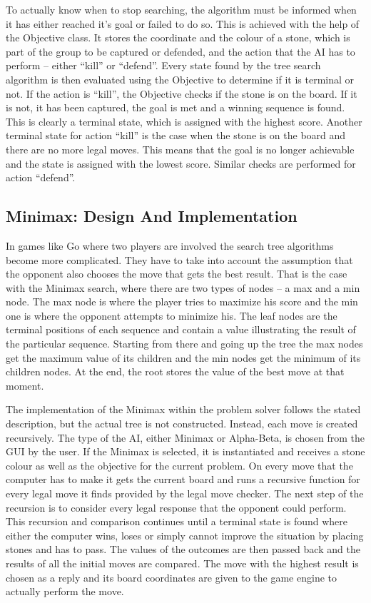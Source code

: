 \documentclass{l3proj}
\begin{document}
To actually know when to stop searching, the algorithm must be informed when it has either reached it's goal or failed to do so. This is achieved with the help of the Objective class. It stores the coordinate and the colour of a stone, which is part of the group to be captured or defended, and the action that the AI has to perform – either “kill” or “defend”. Every state found by the tree search algorithm is then evaluated using the Objective to determine if it is terminal or not. If the action is “kill”, the Objective checks if the stone is on the board. If it is not, it has been captured, the goal is met and a winning sequence is found. This is clearly a terminal state, which is assigned with the highest score. Another terminal state for action “kill” is the case when the stone is on the board and there are no more legal moves. This means that the goal is no longer achievable and the state is assigned with the lowest score. Similar checks are performed for action “defend”.

\subsection{Minimax: Design And Implementation}

In games like Go where two players are involved the search tree algorithms become more complicated. They have to take into account the assumption that the opponent also chooses the move that gets the best result. That is the case with the Minimax search, where there are two types of nodes – a max and a min node. The max node is where the player tries to maximize his score and the min one is where the opponent attempts to minimize his. The leaf nodes are the terminal positions of each sequence and contain a value illustrating the result of the particular sequence. Starting from there and going up the tree the max nodes get the maximum value of its children and the min nodes get the minimum of its children nodes. At the end, the root stores the value of the best move at that moment.  

The implementation of the Minimax within the problem solver follows the stated description, but the actual tree is not constructed. Instead, each move is created recursively. The type of the AI, either Minimax or Alpha-Beta, is chosen from the GUI by the user. If the Minimax is selected, it is instantiated and receives a stone colour as well as the objective for the current problem. On every move that the computer has to make it gets the current board and runs a recursive function for every legal move it finds provided by the legal move checker. The next step of the recursion is to consider every legal response that the opponent could perform. This recursion and comparison continues until a terminal state is found where either the computer wins, loses or simply cannot improve the situation by placing stones and has to pass. The values of the outcomes are then passed back and the results of all the initial moves are compared. The move with the highest result is chosen as a reply and its board coordinates are given to the game engine to actually perform the move.
\end{document}
